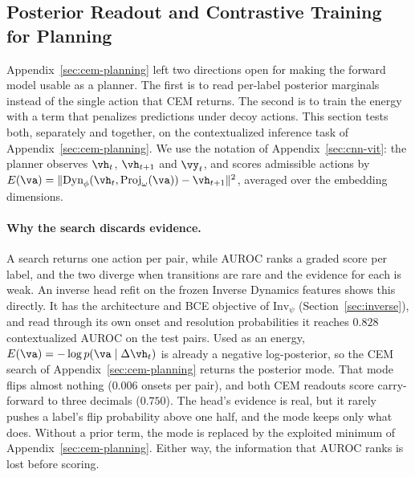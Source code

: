 \subsection{Posterior Readout and Contrastive Training for Planning}
\label{sec:posterior-planning}

Appendix~\ref{sec:cem-planning} left two directions open for making the forward model usable as a planner. The first is to read per-label posterior marginals instead of the single action that CEM returns. The second is to train the energy with a term that penalizes predictions under decoy actions. This section tests both, separately and together, on the contextualized inference task of Appendix~\ref{sec:cem-planning}. We use the notation of Appendix~\ref{sec:cnn-vit}: the planner observes $\vh_t$, $\vh_{t+1}$ and $\vy_t$, and scores admissible actions by $E(\va)=\lVert\text{Dyn}_\phi(\vh_t,\text{Proj}_\omega(\va))-\vh_{t+1}\rVert^2$, averaged over the embedding dimensions.

\paragraph{Why the search discards evidence.} A search returns one action per pair, while AUROC ranks a graded score per label, and the two diverge when transitions are rare and the evidence for each is weak. An inverse head refit on the frozen Inverse Dynamics features shows this directly. It has the architecture and BCE objective of $\text{Inv}_\psi$ (Section~\ref{sec:inverse}), and read through its own onset and resolution probabilities it reaches $0.828$ contextualized AUROC on the test pairs. Used as an energy, $E(\va)=-\log p(\va\mid\Delta\vh_t)$ is already a negative log-posterior, so the CEM search of Appendix~\ref{sec:cem-planning} returns the posterior mode. That mode flips almost nothing ($0.006$ onsets per pair), and both CEM readouts score carry-forward to three decimals ($0.750$). The head's evidence is real, but it rarely pushes a label's flip probability above one half, and the mode keeps only what does. Without a prior term, the mode is replaced by the exploited minimum of Appendix~\ref{sec:cem-planning}. Either way, the information that AUROC ranks is lost before scoring.

